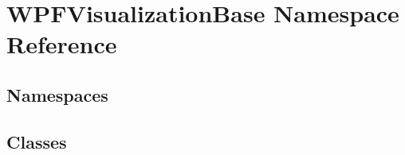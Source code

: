 \hypertarget{namespace_w_p_f_visualization_base}{}\section{W\+P\+F\+Visualization\+Base Namespace Reference}
\label{namespace_w_p_f_visualization_base}
\subsection*{Namespaces}
\begin{DoxyCompactItemize}
\end{DoxyCompactItemize}
\subsection*{Classes}
